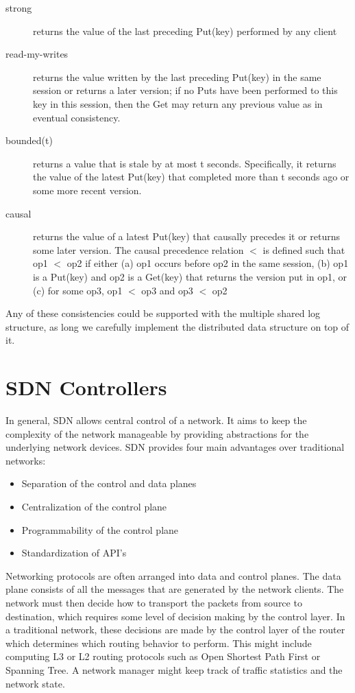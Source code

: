 \documentclass[letterpaper,twocolumn,10pt]{article}
\begin{document}
\begin{description}
\item[strong] returns the value of the last preceding Put(key) performed by any client
\item[read-my-writes] returns the value written by the last preceding Put(key) in the same session or returns a later version; if no Puts have been performed to this key in this session, then the Get may return any previous value as in eventual consistency.
\item[bounded(t)] returns a value that is stale by at most t seconds. Specifically, it returns the value of the latest Put(key) that completed more than t seconds ago or some more recent version.
\item[causal] returns the value of a latest Put(key) that causally precedes it or returns some later version. The causal precedence relation $<$ is defined such that op1 $<$ op2 if either
(a) op1 occurs before op2 in the same session,
(b) op1 is a Put(key) and op2 is a Get(key) that
returns the version put in op1, or
(c) for some op3, op1 $<$ op3 and op3 $<$ op2
\end{description}

Any of these consistencies could be supported with the multiple shared log structure, as long we carefully implement the distributed data structure on top of it.

\section{SDN Controllers}

In general, SDN allows central control of a network. It aims to keep the complexity of the network manageable by providing abstractions for the underlying network devices. SDN provides four main advantages over traditional networks:\cite{jain2013network}

\begin{itemize}
\item Separation of the control and data planes
\item Centralization of the control plane
\item Programmability of the control plane
\item Standardization of API's
\end{itemize}
\cite{SDN}

Networking protocols are often arranged into data and control planes. The data plane consists of all the messages that are generated by the network clients. The network must then decide how to transport the packets from source to destination, which requires some level of decision making by the control layer. In a traditional network, these decisions are made by the control layer of the router which determines which routing behavior to perform. This might include computing L3 or L2
routing protocols such as Open Shortest Path First or Spanning Tree. A network manager might keep track of traffic statistics and the network state.
\end{document}
